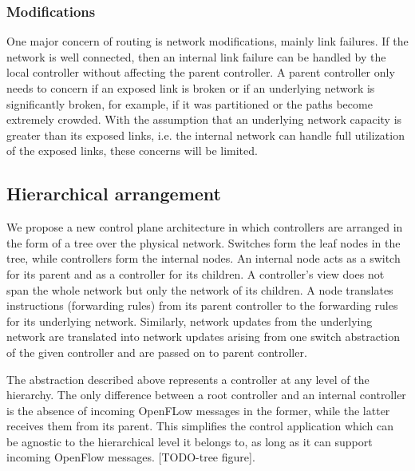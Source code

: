 \documentclass[10pt, twocolumn]{article}
\begin{document}
\subsubsection{Modifications}
One major concern of routing is network modifications, mainly link failures. If the network is well connected, then an internal link failure can be handled by the local controller without affecting the parent controller. A parent controller only needs to concern if an exposed link is broken or if an underlying network is significantly broken, for example, if it was partitioned or the paths become extremely crowded. With the assumption that an underlying network capacity is greater than its exposed links, i.e. the internal network can handle full utilization of the exposed links, these concerns will be limited.

\subsection{Hierarchical arrangement}
We propose a new control plane architecture in which controllers are arranged in the form of a tree over the physical network. Switches form the leaf nodes in the tree, while controllers form the internal nodes. An internal node acts as a switch for its parent and as a controller for its children. A controller's view does not span the whole network but only the network of its children. A node translates instructions (forwarding rules) from its parent controller to the forwarding rules for its underlying network. Similarly, network updates from the underlying network are translated into network updates arising from one switch abstraction of the given controller and are passed on to parent controller.

The abstraction described above represents a controller at any level of the hierarchy. The only difference between a root controller and an internal controller is the absence of incoming OpenFLow messages in the former, while the latter receives them from its parent. This simplifies the control application which can be agnostic to the hierarchical level it belongs to, as long as it can support incoming OpenFlow messages. [TODO-tree figure].
\end{document}

